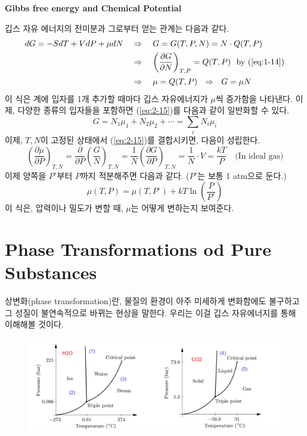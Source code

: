 \documentclass{article}
\begin{document}
\noindent
\textbf{Gibbs free energy and Chemical Potential}

깁스 자유 에너지의 전미분과 그로부터 얻는 관계는 다음과 같다.
\begin{align}
    dG = - SdT + VdP + \mu dN  \quad &\Rightarrow \quad G=G(T,P,N) = N \cdot Q(T,P)\\ \nonumber
    &\Rightarrow \quad \left( \frac{\partial G}{\partial N} \right)_{T,P} = Q(T,P) \ \ \text{by }(\ref{eq:1-14})\\
    &\Rightarrow \quad \mu = Q (T,P) \ \ \Rightarrow \ \ G = \mu N \label{eq:2-15}
\end{align}
이 식은 계에 입자를 1개 추가할 때마다 깁스 자유에너지가 $\mu$씩 증가함을 나타낸다. 이제, 다양한 종류의 입자들을 포함하면 (\ref{eq:2-15})를 다음과 같이 일반화할 수 있다.
\begin{equation}
    G = N_1 \mu_1 + N_2 \mu_2 + \cdots = \sum_i N_i \mu_i
\end{equation}
이제, $T,N$이 고정된 상태에서 (\ref{eq:2-15})를 결합시키면, 다음이 성립한다.
\begin{equation}
    \left( \frac{\partial \mu}{\partial P} \right)_{T,N} = \frac{\partial }{\partial P} \left( \frac{G}{N} \right)_{T,N} = \frac{1}{N} \left( \frac{\partial G}{\partial P} \right)_{T,N} = \frac{1}{N} \cdot V = \frac{kT}{P} \quad \text{(In ideal gas)}
\end{equation}
이제 양쪽을 $P^\circ$부터 $P$까지 적분해주면 다음과 같다. ($P^\circ$는 보통 1 atm으로 둔다.)
\begin{equation}
    \mu(T,P) = \mu(T, P^\circ) + kT \ln \left( \frac{P}{P^\circ} \right)
\end{equation}
이 식은, 압력이나 밀도가 변할 때, $\mu$는 어떻게 변하는지 보여준다.

\newpage

\section{Phase Transformations od Pure Substances}

상변화(phase transformation)란, 물질의 환경이 아주 미세하게 변화함에도 불구하고 그 성질이 불연속적으로 바뀌는 현상을 말한다. 우리는 이걸 깁스 자유에너지를 통해 이해해볼 것이다.

\begin{figure}[h]
    \centering
    \includegraphics[width=0.95\linewidth]{images/fig3_1.png}
\end{figure}
\end{document}
